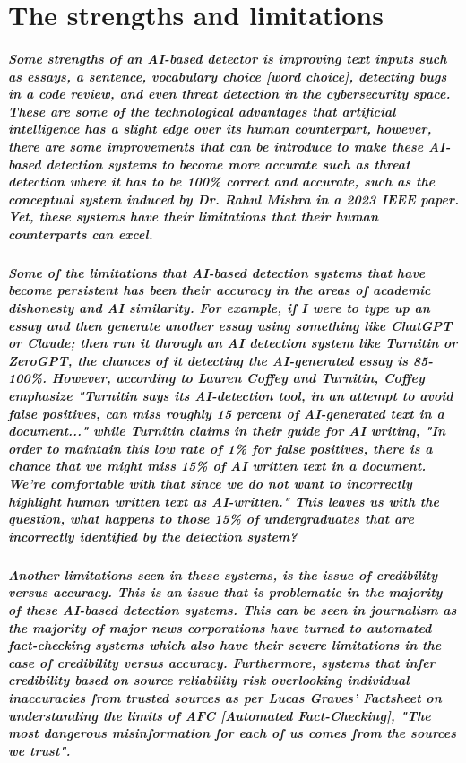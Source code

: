 \documentclass[12pt,letterpaper,final]{report}
\begin{document}
\chapter{The strengths and limitations}

\paragraph{
Some strengths of an AI-based detector is improving text inputs such as essays, a sentence, vocabulary choice [word choice], detecting bugs in a code review, and even threat detection in the cybersecurity space. These are some of the technological advantages that artificial intelligence has a slight edge over its human counterpart, however, there are some improvements that can be introduce to make these AI-based detection systems to become more accurate such as threat detection where it has to be 100\% correct and accurate, such as the conceptual system induced by Dr. Rahul Mishra in a 2023 IEEE paper. Yet, these systems have their limitations that their human counterparts can excel.
}
\paragraph{
Some of the limitations that AI-based detection systems that have become persistent has been their accuracy in the areas of academic dishonesty and AI similarity. For example, if I were to type up an essay and then generate another essay using something like ChatGPT or Claude; then run it through an AI detection system like Turnitin or ZeroGPT, the chances of it detecting the AI-generated essay is 85-100\%. However, according to Lauren Coffey and Turnitin, Coffey emphasize "Turnitin says its AI-detection tool, in an attempt to avoid false positives, can miss roughly 15 percent of AI-generated text in a document..." while Turnitin claims in their guide for AI writing, "In order to maintain this low rate of 1\% for false positives, there is a chance that we might miss 15\% of AI written text in a document. We’re comfortable with that since we do not want to incorrectly highlight human written text as AI-written." This leaves us with the question, what happens to those 15\% of undergraduates that are incorrectly identified by the detection system?
}
\paragraph{
Another limitations seen in these systems, is the issue of credibility versus accuracy. This is an issue that is problematic in the majority of these AI-based detection systems. This can be seen in journalism as the majority of major news corporations have turned to automated fact-checking systems which also have their severe limitations in the case of credibility versus accuracy. Furthermore, systems that infer credibility based on source reliability risk overlooking individual inaccuracies from trusted sources as per Lucas Graves' Factsheet on understanding the limits of AFC [Automated Fact-Checking], "The most dangerous misinformation for each of us comes from the sources we trust".
}
\end{document}
